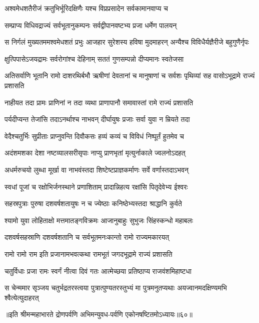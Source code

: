 \twolineshloka
{अश्वमेधशतैरीजं क्रतुभिर्भूरिदक्षिणैः}
{यश्च विप्रप्रसादेन सर्वकामानवाप्य च}


\twolineshloka
{सम्प्राप्य विधिवद्राज्यं सर्वभूतानुकम्पनः}
{सर्वद्वीपानवष्टभ्य प्रजा धर्मेण पालयन्}


\threelineshloka
{स निर्गलं मुख्यतममश्वमेधशतं प्रभुः}
{आजहार सुरेशस्य हविषा मुदमाहरन्}
{अन्यैश्च विविधैर्यज्ञैरीजे बहुगुणैर्नृपः}


\twolineshloka
{क्षुत्पिपासेऽजयद्रामः सर्वरोगांश्च देहिनाम्}
{सततं गुणसम्पन्नो दीप्यमानः स्वतेजसा}


\threelineshloka
{अतिसर्वाणि भूतानि रामो दाशरथिर्बभौ}
{ऋषीणां देवतानां च मानुषाणां च सर्वशः}
{पृथिव्यां सह वासोऽभूद्रामे राज्यं प्रशासति}


\twolineshloka
{नाहीयत तदा प्रामः प्राणिनां न तदा व्यथा}
{प्राणापानौ समावास्तां रामे राज्यं प्रशासति}


\twolineshloka
{पर्यदीप्यन्त तेजांसि तदाऽनर्थाश्च नाभवन्}
{दीर्घायुषः प्रजाः सर्वा युवा न म्रियते तदा}


\twolineshloka
{वेदैश्चतुर्भिः सुप्रीताः प्राप्नुवन्ति दिवौकसः}
{हव्यं कव्यं च विविधं निष्पूर्तं हुतमेव च}


\twolineshloka
{अदंशमशका देशा नष्टव्यालसरीसृपाः}
{नाप्यु प्राणभृतां मृत्युर्नाकाले ज्वलनोऽदहत्}


\twolineshloka
{अधर्मरुचयो लुब्धा मूर्खा वा नाभवंस्तदा}
{शिष्टेष्टप्राज्ञकर्माणः सर्वे वर्णास्तदाऽभवन्}


\twolineshloka
{स्वधां पूजां च रक्षोभिर्जनस्थाने प्रणाशिताम्}
{प्रादान्निहत्य रक्षांसि पितृदेवेभ्य ईश्वरः}


\twolineshloka
{सहस्रपुत्राः पुरुषा दशवर्षशतायुषः}
{न च ज्येष्ठाः कनिष्ठेभ्यस्तदा श्राद्धानि कुर्वते}


\twolineshloka
{श्यामो युवा लोहिताक्षो मत्तमातङ्गविक्रमः}
{आजानुबाहुः सुभुजः सिंहस्कन्धो महाबलः}


\twolineshloka
{दशवर्षसहस्राणि दशवर्षशतानि च}
{सर्वभूतमनःकान्तो रामो राज्यमकारयत्}


\twolineshloka
{रामो रामो राम इति प्रजानामभवत्कथा}
{रामभूतं जगदभूद्रामे राज्यं प्रशासति}


\twolineshloka
{चतुर्विधाः प्रजा रामः स्वर्गं नीत्वा दिवं गतः}
{आत्मेच्छया प्रतिष्ठाप्य राजवंशमिहाष्टधा}


\threelineshloka
{स चेन्ममार सृञ्जय चतुर्भद्रतरस्त्वया}
{पुत्रात्पुण्यतरस्तुभ्यं मा पुत्रमनुतप्यथाः}
{अयज्वानमदक्षिण्यमभि श्वैत्येत्युदाहरत्}


॥इति श्रीमन्महाभारते द्रोणपर्वणि अभिमन्युवध-पर्वणि एकोनषष्टितमोऽध्यायः॥६०॥

\closesection